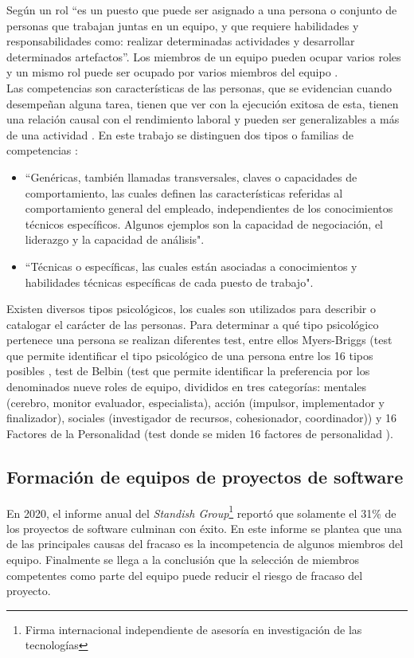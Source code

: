 Según \cite{64} un rol “es un puesto que puede ser asignado a una persona o conjunto de personas que trabajan juntas en un equipo, y que requiere habilidades y responsabilidades como: realizar determinadas actividades y desarrollar determinados artefactos”. Los miembros de un equipo pueden ocupar varios roles y un mismo rol puede ser ocupado por varios miembros del equipo \citep{Mayi09}.\\

Las competencias son características de las personas, que se evidencian cuando desempeñan alguna tarea, tienen que ver con la ejecución exitosa de esta, tienen una relación causal con el rendimiento laboral y pueden ser generalizables a más de una actividad \cite{Boyatzis1982}. En este trabajo se distinguen dos tipos o familias de competencias \citep{Mayi09, 76}:
\begin{itemize}
	\item  “Genéricas, también llamadas transversales, claves o capacidades de comportamiento, las cuales definen las características referidas al comportamiento general del empleado, independientes de los conocimientos técnicos específicos. Algunos ejemplos son la capacidad de negociación, el liderazgo y la capacidad de análisis".
	\item  “Técnicas o específicas, las cuales están asociadas a conocimientos y habilidades técnicas específicas de cada puesto de trabajo".
\end{itemize}

Existen diversos tipos psicológicos, los cuales son utilizados para describir o catalogar el carácter de las personas. Para determinar a qué tipo psicológico pertenece una persona se realizan diferentes test, entre ellos Myers-Briggs (test que permite identificar el tipo psicológico de una persona entre los 16 tipos posibles \citep{117, 119}, test de Belbin (test que permite identificar la preferencia por los denominados nueve roles de equipo, divididos en tres categorías: mentales (cerebro, monitor evaluador, especialista), acción (impulsor, implementador y finalizador), sociales (investigador de recursos, cohesionador, coordinador)) y 16 Factores de la Personalidad (test donde se miden 16 factores de personalidad \citep{118}).

\subsection{Formación de equipos de proyectos de software}

En 2020, el informe anual del \textit{Standish Group}\footnote{Firma internacional independiente de asesoría en investigación de las tecnologías}\cite{Group2020} reportó que solamente el 31\% de los proyectos de software culminan con éxito. En este informe se plantea que una de las principales causas del fracaso es la incompetencia de algunos miembros del equipo. Finalmente se llega a la conclusión que la selección de miembros competentes como parte del equipo puede reducir el riesgo de fracaso del proyecto.\\

